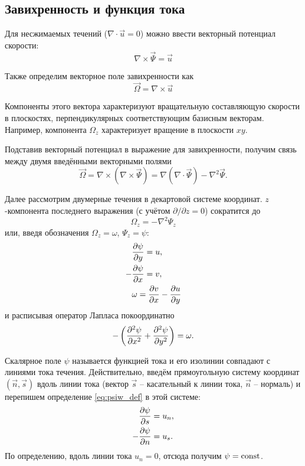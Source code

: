 \subsection{Завихренность и функция тока}

Для несжимаемых течений ($\nabla\cdot\vec u = 0$) можно ввести векторный потенциал скорости:
\begin{equation*}
    \nabla\times\vec\Psi = \vec u
\end{equation*}

Также определим векторное поле завихренности как
\begin{equation*}
    \vec \Omega = \nabla \times \vec u
\end{equation*}

Компоненты этого вектора характеризуют вращательную составляющую скорости в
плоскостях, перпендикулярных соответствующим базисным векторам.
Например, компонента $\Omega_z$ характеризует вращение в плоскости $xy$.

Подставив векторный потенциал в выражение для завихренности, получим связь между двумя введёнными векторными полями
\begin{equation*}
    \vec \Omega = \nabla \times \left( \nabla \times \vec \Psi \right) = \nabla\left(\nabla\cdot\vec\Psi\right) - \nabla^2\vec\Psi.
\end{equation*}

Далее рассмотрим двумерные течения в декартовой системе координат. $z$-компонента
последнего выражения (с учётом $\partial/\partial z=0$) сократится до
\begin{equation*}
    \Omega_z = -\nabla^2\Psi_z
\end{equation*}
или, введя обозначения $\Omega_z = \omega$, $\Psi_z = \psi$:
\begin{align}
    \nonumber
     &\frac{\partial \psi}{\partial y} = u, \\
    \label{eq:psiw_def}
    -&\frac{\partial \psi}{\partial x} = v, \\
    \nonumber
     &\omega = \frac{\partial v}{\partial x} - \frac{\partial u}{\partial y}
\end{align}
и расписывая оператор Лапласа покоординатно
\begin{equation}
    \label{eq:psiw}
    -\left(\frac{\partial^2 \psi}{\partial x^2} + \frac{\partial^2 \psi}{\partial y^2}\right) = \omega.
\end{equation}

Скалярное поле $\psi$ называется функцией тока и его изолинии совпадают с линиями тока течения.
Действительно, введём прямоугольную систему координат $(\vec n, \vec s)$ вдоль линии тока
(вектор $\vec s$ -- касательный к линии тока, $\vec n$ -- нормаль) и 
перепишем определение \eqref{eq:psiw_def} в этой системе:
\begin{align}
    \label{eq:psi_bc}
     &\frac{\partial \psi}{\partial s} = u_n, \\
    \nonumber
    -&\frac{\partial \psi}{\partial n} = u_s.
\end{align}
По определению, вдоль линии тока $u_n = 0$, отсюда получим $\psi = \rm{const}$.

